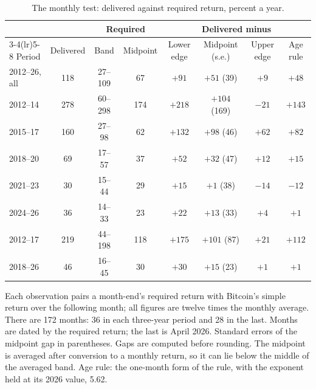 \documentclass[11pt]{article}
\begin{document}
\begin{table}[ht]\centering\small
\caption{The monthly test: delivered against required return, percent a year.}
\label{tab:monthly}
\setlength{\tabcolsep}{5pt}
\begin{tabular}{lccccccc}
\toprule
 & & \multicolumn{2}{c}{Required} & \multicolumn{4}{c}{Delivered minus} \\
\cmidrule(lr){3-4}\cmidrule(lr){5-8}
Period & Delivered & Band & Midpoint & Lower edge & Midpoint (s.e.) & Upper edge & Age rule \\
\midrule
2012--26, all & 118 & 27--109 & 67 & $+91$ & $+51$ (39) & $+9$ & $+48$ \\
\midrule
2012--14 & 278 & 60--298 & 174 & $+218$ & $+104$ (169) & $-21$ & $+143$ \\
2015--17 & 160 & 27--98 & 62 & $+132$ & $+98$ (46) & $+62$ & $+82$ \\
2018--20 & 69 & 17--57 & 37 & $+52$ & $+32$ (47) & $+12$ & $+15$ \\
2021--23 & 30 & 15--44 & 29 & $+15$ & $+1$ (38) & $-14$ & $-12$ \\
2024--26 & 36 & 14--33 & 23 & $+22$ & $+13$ (33) & $+4$ & $+1$ \\
\midrule
2012--17 & 219 & 44--198 & 118 & $+175$ & $+101$ (87) & $+21$ & $+112$ \\
2018--26 & 46 & 16--45 & 30 & $+30$ & $+15$ (23) & $+1$ & $+1$ \\
\bottomrule
\end{tabular}
\par\smallskip\begin{minipage}{0.86\textwidth}\footnotesize Each observation pairs a month-end's required return with Bitcoin's simple return over the following month; all figures are twelve times the monthly average. There are 172 months: 36 in each three-year period and 28 in the last. Months are dated by the required return; the last is April 2026. Standard errors of the midpoint gap in parentheses. Gaps are computed before rounding. The midpoint is averaged after conversion to a monthly return, so it can lie below the middle of the averaged band. Age rule: the one-month form of the rule, with the exponent held at its 2026 value, 5.62.\end{minipage}
\end{table}
\end{document}
